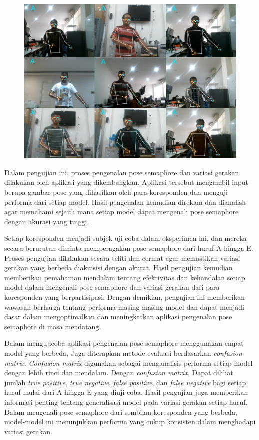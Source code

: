\begin{figure}[!hbt]
	\centering
	\includegraphics[width=0.7\linewidth]{gambar/bener/Gambar_Ujicoba.png}
	\label{fig:HasilUjicoba}
\end{figure}

Dalam pengujian ini, proses pengenalan pose semaphore dan variasi gerakan dilakukan oleh aplikasi yang dikembangkan. Aplikasi tersebut mengambil input berupa gambar pose yang dihasilkan oleh para koresponden dan menguji performa dari setiap model. Hasil pengenalan kemudian direkam dan dianalisis agar memahami sejauh mana setiap model dapat mengenali pose semaphore dengan akurasi yang tinggi.

Setiap koresponden menjadi subjek uji coba dalam eksperimen ini, dan mereka secara berurutan diminta  memperagakan pose semaphore dari huruf A hingga E. Proses pengujian dilakukan secara teliti dan cermat agar memastikan variasi gerakan yang berbeda diakuisisi dengan akurat. Hasil pengujian kemudian memberikan pemahaman mendalam tentang efektivitas dan kehandalan setiap model dalam mengenali pose semaphore dan variasi gerakan dari para koresponden yang berpartisipasi. Dengan demikian, pengujian ini memberikan wawasan berharga tentang performa masing-masing model dan dapat menjadi dasar dalam mengoptimalkan dan meningkatkan aplikasi pengenalan pose semaphore di masa mendatang.

Dalam mengujicoba aplikasi pengenalan pose semaphore menggunakan empat model yang berbeda, Juga diterapkan metode evaluasi berdasarkan \textit{confusion matrix}. \textit{Confusion matrix} digunakan sebagai menganalisis performa setiap model dengan lebih rinci dan mendalam. Dengan \textit{confusion matrix}, Dapat dilihat jumlah\textit{ true positive}, \textit{true negative}, \textit{false positive}, dan \textit{false negative} bagi setiap huruf mulai dari A hingga E yang diuji coba. Hasil pengujian juga memberikan informasi penting tentang generalisasi model pada variasi gerakan setiap huruf. Dalam mengenali pose semaphore dari sembilan koresponden yang berbeda, model-model ini menunjukkan performa yang cukup konsisten dalam menghadapi variasi gerakan.

